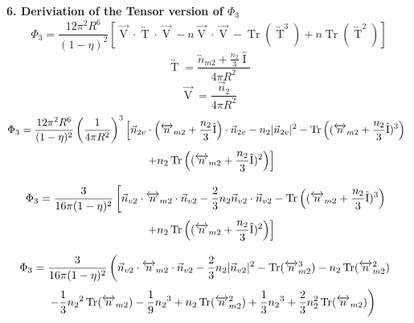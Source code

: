 \documentclass[double,12pt]{beavtex}
\begin{document}
\textbf{6. Deriviation of the Tensor version of $\Phi_3$ }
\[{}\]
\begin{equation}{\Phi_3=\frac{12\pi^2R^6}{(1-\eta)^2}\left[\overrightarrow{\operatorname{V}}\cdot\overleftrightarrow{\operatorname{T}}\cdot\overrightarrow{\operatorname{V}}-n\overrightarrow{\operatorname{V}}\cdot\overrightarrow{\operatorname{V}}-\operatorname{Tr}\left(\overleftrightarrow{\operatorname{T}}^3\right)+n\operatorname{Tr}\left(\overleftrightarrow{\operatorname{T}}^2\right)\right]}\end{equation}
\[{}\]
\begin{equation}{\overleftrightarrow{\operatorname{T}}=\frac{{\overleftrightarrow{n}_{m2}}+\frac{n_2}{3}\hat{\operatorname{I}}}{4\pi{R}^2}}\end{equation}
\[{}\]
\begin{equation}{\overrightarrow{\operatorname{V}}=\frac{\vec{n}_2}{4\pi{R}^2}}\end{equation}
\[{}\]
\begin{displaymath}{\Phi_3=\frac{12\pi^2R^6}{(1-\eta)^2}\left(\frac{1}{4\pi{R}^2}\right)^3\left[\vec{n}_{2v}\cdot\left({\overleftrightarrow{n}_{m2}}+\frac{n_2}{3}\hat{\operatorname{I}}\right)\cdot\vec{n}_{2v}-n_2|\vec{n}_{2v}|^2-\operatorname{Tr}\left(({\overleftrightarrow{n}_{m2}}+\frac{n_2}{3}\hat{\operatorname{I}})^3\right)\color{white}\right]\color{black}}\end{displaymath}
\begin{equation}{\color{white}\left[\color{black}+n_2\operatorname{Tr}\left(({\overleftrightarrow{n}_{m2}}+\frac{n_2}{3}\hat{\operatorname{I}})^2\right)\right]}\end{equation}
\[{}\]
\begin{displaymath}{\Phi_3=\frac{3}{16\pi(1-\eta)^2}\left[\vec{n}_{v2}\cdot{\overleftrightarrow{n}_{m2}}\cdot{\vec{n}_{v2}}-\frac{2}{3}n_2\vec{n}_{v2}\cdot\vec{n}_{v2}-\operatorname{Tr}\left(({\overleftrightarrow{n}_{m2}}+\frac{n_2}{3}\hat{\operatorname{I}})^3\right)\color{white}\right]\color{black}}\end{displaymath}\begin{equation}{\color{white}\left[\color{black}+n_2\operatorname{Tr}\left((\overleftrightarrow{n}_{m2}+\frac{n_2}{3}\hat{\operatorname{I}})^2\right)\right]}\end{equation}
\[{}\]
\begin{displaymath}{\Phi_3=\frac{3}{16\pi(1-\eta)^2}\left(\vec{n}_{v2}\cdot{\overleftrightarrow{n}_{m2}}\cdot{\vec{n}_{v2}}-\frac{2}{3}n_2|\vec{n}_{v2}|^2-\operatorname{Tr}({\overleftrightarrow{n}_{m2}^3})
-n_2\operatorname{Tr}(\overleftrightarrow{n}_{m2}^2)\color{white}\right)\color{black}}\end{displaymath} \begin{equation}{\color{white}\left(\color{black}-\frac{1}{3}{n_2}^2\operatorname{Tr}(\overleftrightarrow{n}_{m2})-\frac{1}{9}{n_2}^3+n_2\operatorname{Tr}(\overleftrightarrow{n}_{m2}^2)+\frac{1}{3}{n_2}^3+\frac{2}{3}n^2_2\operatorname{Tr}(\overleftrightarrow{n}_{m2})\right)}\end{equation} 
\end{document}
